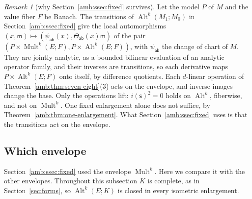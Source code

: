 \documentclass[11pt]{amsart}
\theoremstyle{definition}
\theoremstyle{remark}
\newtheorem{remark}[theorem]{Remark}
\numberwithin{equation}{section}
\newcommand{\Alt}{\operatorname{Alt}}
\newcommand{\Mult}{\operatorname{Mult}}
\theoremstyle{plain}
\theoremstyle{definition}
\theoremstyle{plain}
\begin{document}
\begin{remark}[why Section~\ref{amb:ssec:fixed} survives]\label{amb:rem:action}
Let the model $P$ of $M$ and the value fiber $F$ be Banach. The transitions of $\Alt^k(M_1;M_0)$ in Section~\ref{amb:ssec:fixed} give the local automorphisms $(x,\mathsf m)\mapsto(\psi_{\mathsf{ab}}(x),\Theta_{\mathsf{ab}}(x)\mathsf m)$ of the pair $(P\times\Mult^k(E;F),P\times\Alt^k(E;F))$, with $\psi_{\mathsf{ab}}$ the change of chart of $M$. They are jointly analytic, as a bounded bilinear evaluation of an analytic operator family, and their inverses are transitions, so each derivative maps $P\times\Alt^k(E;F)$ onto itself, by difference quotients. Each $d$-linear operation of Theorem~\ref{amb:thm:seven-eight}(3) acts on the envelope, and inverse images change the base. Only the operations lift: $i(\mathsf s)^2=0$ holds on $\Alt^k$, fiberwise, and not on $\Mult^k$. One fixed enlargement alone does not suffice, by Theorem~\ref{amb:thm:one-enlargement}. What Section~\ref{amb:ssec:fixed} uses is that the transitions act on the envelope.
\end{remark}
\subsection{Which envelope}\label{amb:ssec:envelope}

Section~\ref{amb:ssec:fixed} used the envelope $\Mult^k$. Here we compare it with the other envelopes. Throughout this subsection $K$ is complete, as in Section~\ref{sec:forms}, so $\Alt^k(E;K)$ is closed in every isometric enlargement.
\end{document}
